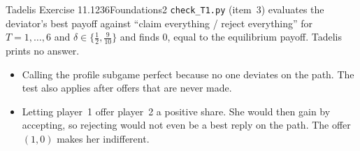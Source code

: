 \begin{exsol}{Tadelis Exercise 11.1}{236}{Foundations}{2}
\verify \texttt{check\_T1.py} (item~3) evaluates the deviator's best payoff against ``claim everything /
reject everything'' for $T = 1,\dots,6$ and $\delta \in \{\frac12, \frac9{10}\}$ and finds $0$, equal to the
equilibrium payoff. Tadelis prints no answer.

\mistakes
\begin{itemize}
  \item Calling the profile subgame perfect because no one deviates on the path. The test also applies
  after offers that are never made.
  \item Letting player~1 offer player~2 a positive share. She would then gain by accepting, so rejecting
  would not even be a best reply on the path. The offer $(1,0)$ makes her indifferent.
\end{itemize}

\end{exsol}
